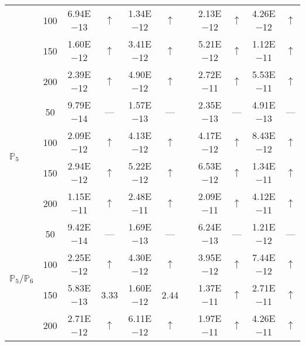 \begin{table}[H]
{\begin{tabular}{@{}l c c c c c c c c c c@{}}
 & 100 & 6.94E$-$13 & $\uparrow$  & 1.34E$-$12 & $\uparrow$ &  & 2.13E$-$12 & $\uparrow$ & 4.26E$-$12 & $\uparrow$\\
 & 150 & 1.60E$-$12 & $\uparrow$  & 3.41E$-$12 & $\uparrow$ &  & 5.21E$-$12 & $\uparrow$ & 1.12E$-$11 & $\uparrow$\\
 & 200 & 2.39E$-$12 & $\uparrow$  & 4.90E$-$12 & $\uparrow$ &  & 2.72E$-$11 & $\uparrow$ & 5.53E$-$11 & $\uparrow$\\
\midrule
\multirow{4}{*}{$\mathbb{P}_{5}$}
 & 50 & 9.79E$-$14 & ---  & 1.57E$-$13 & --- &  & 2.35E$-$13 & --- & 4.91E$-$13 & ---\\
 & 100 & 2.09E$-$12 & $\uparrow$  & 4.13E$-$12 & $\uparrow$ &  & 4.17E$-$12 & $\uparrow$ & 8.43E$-$12 & $\uparrow$\\
 & 150 & 2.94E$-$12 & $\uparrow$  & 5.22E$-$12 & $\uparrow$ &  & 6.53E$-$12 & $\uparrow$ & 1.34E$-$11 & $\uparrow$\\
 & 200 & 1.15E$-$11 & $\uparrow$  & 2.48E$-$11 & $\uparrow$ &  & 2.09E$-$11 & $\uparrow$ & 4.12E$-$11 & $\uparrow$\\
\midrule
\multirow{4}{*}{$\mathbb{P}_{5}/\mathbb{P}_{6}$}
 & 50 & 9.42E$-$14 & ---  & 1.69E$-$13 & --- &  & 6.24E$-$13 & --- & 1.21E$-$12 & ---\\
 & 100 & 2.25E$-$12 & $\uparrow$  & 4.30E$-$12 & $\uparrow$ &  & 3.95E$-$12 & $\uparrow$ & 7.44E$-$12 & $\uparrow$\\
 & 150 & 5.83E$-$13 & 3.33  & 1.60E$-$12 & 2.44 &  & 1.37E$-$11 & $\uparrow$ & 2.71E$-$11 & $\uparrow$\\
 & 200 & 2.71E$-$12 & $\uparrow$  & 6.11E$-$12 & $\uparrow$ &  & 1.97E$-$11 & $\uparrow$ & 4.26E$-$11 & $\uparrow$\\
\bottomrule
\end{tabular}}
\label{none}
\end{table}
